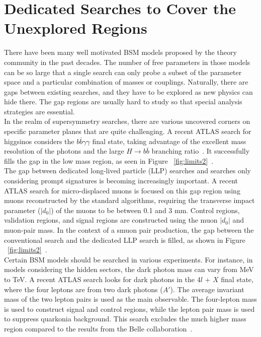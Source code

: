 \documentclass{moriond}
\begin{document}
\section{Dedicated Searches to Cover the Unexplored Regions}

There have been many well motivated BSM models proposed by the theory community
in the past decades. The number of free parameters in those models can be so
large that a single search can only probe a subset of the parameter space and a
particular combination of masses or couplings. Naturally, there are gaps
between existing searches, and they have to be explored as new physics can hide
there. The gap regions are usually hard to study so that special analysis
strategies are essential.\\

In the realm of supersymmetry searches, there are various uncovered corners on
specific parameter planes that are quite challenging. A recent ATLAS search for
higgsinos considers the $b\overline{b}\gamma\gamma$ final state, taking
advantage of the excellent mass resolution of the photons and the large
$H\rightarrow b\overline{b}$ branching ratio~\cite{bbyy}. It successfully fills the gap in
the low mass region, as seen in Figure
~\ref{fig:limits2}~\cite{bbyy}.\\

The gap between dedicated long-lived particle (LLP) searches and searches only
considering prompt signatures is becoming increasingly important. A recent
ATLAS search for micro-displaced muons is focused on this gap region using
muons reconstructed by the standard algorithms, requiring the transverse impact
parameter ($|d_{0}|$) of the muons to be between 0.1 and 3 mm. Control regions,
validation regions, and signal regions are constructed using the muon $|d_{0}|$
and muon-pair mass.  In the context of a smuon pair production, the gap between
the conventional search and the dedicated LLP search is filled, as shown in
Figure ~\ref{fig:limits2}~\cite{micro}.\\   

Certain BSM models should be searched in various experiments. For instance, in models considering the
hidden sectors, the dark photon mass can vary from MeV to TeV. A recent
ATLAS search looks for dark photons in the 4$l$ + $X$ final state, where the
four leptons are from two dark photons ($A'$). The average invariant mass of
the two lepton pairs is used as the main observable. The four-lepton mass is
used to construct signal and control regions, while the lepton pair mass is
used to suppress quarkonia background.  This search excludes the much higher
mass region compared to the results from the Belle collaboration~\cite{dark}.\\
\end{document}
